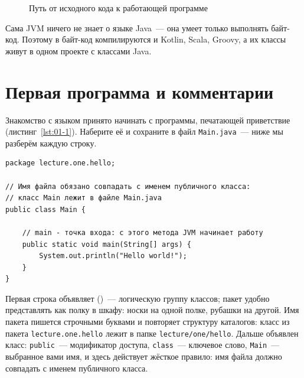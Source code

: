 \begin{figure}[htbp]\centering
{}
\caption{Путь от исходного кода к работающей программе}\label{fig:01-1}
\end{figure}

Сама JVM ничего не знает о языке Java~--- она умеет только выполнять байт-код.
Поэтому в байт-код компилируются и Kotlin, Scala, Groovy, а их классы живут в
одном проекте с классами Java.

\section{Первая программа и комментарии}

Знакомство с языком принято начинать с программы, печатающей приветствие
(листинг~\ref{lst:01-1}). Наберите её и сохраните в файл \texttt{Main.java}~---
ниже мы разберём каждую строку.

\begin{listing}[H]
\begin{verbatim}
package lecture.one.hello;

// Имя файла обязано совпадать с именем публичного класса:
// класс Main лежит в файле Main.java
public class Main {

    // main - точка входа: с этого метода JVM начинает работу
    public static void main(String[] args) {
        System.out.println("Hello world!");
    }
}
\end{verbatim}
\caption{Программа, печатающая приветствие}
\label{lst:01-1}
\end{listing}

Первая строка объявляет  ()~--- логическую группу
классов; пакет удобно представлять как полку в шкафу: носки на одной полке,
рубашки на другой. Имя пакета пишется строчными буквами и повторяет структуру
каталогов: класс из пакета \texttt{lecture.one.hello} лежит в папке
\texttt{lecture/one/hello}. Дальше объявлен класс: \texttt{public}~---
модификатор доступа, \texttt{class}~--- ключевое слово, \texttt{Main}~---
выбранное вами имя, и здесь действует жёсткое правило: имя файла должно
совпадать с именем публичного класса.


